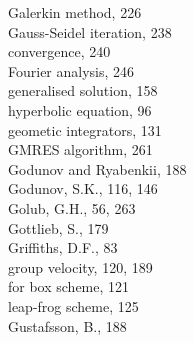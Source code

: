 \documentclass[10pt]{article}
\begin{document}
Galerkin method, 226\\
Gauss-Seidel iteration, 238\\
convergence, 240\\
Fourier analysis, 246\\
generalised solution, 158\\
hyperbolic equation, 96\\
geometic integrators, 131\\
GMRES algorithm, 261\\
Godunov and Ryabenkii, 188\\
Godunov, S.K., 116, 146\\
Golub, G.H., 56, 263\\
Gottlieb, S., 179\\
Griffiths, D.F., 83\\
group velocity, 120, 189\\
for box scheme, 121\\
leap-frog scheme, 125\\
Gustafsson, B., 188
\end{document}
